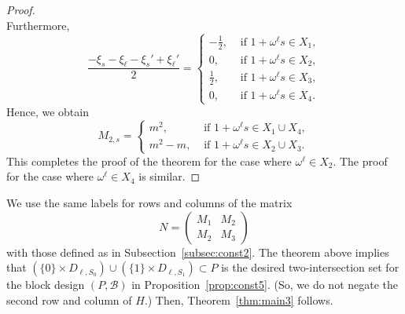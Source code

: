 \documentclass[10pt]{amsart}
\theoremstyle{definition}
\begin{document}
\begin{proof}
\[\]
Furthermore,
\[
\frac{-\xi_s-\xi_{\ell}-\xi_s'+\xi_{\ell}'}{2}=
\begin{cases}
-\frac{1}{2},& \text{ if } 1+\omega^{\ell} s\in X_1,\\
0,& \text{ if } 1+\omega^{\ell} s\in X_2, \\
\frac{1}{2},& \text{ if }1+\omega^{\ell} s\in X_3,\\
0,& \text{ if } 1+\omega^{\ell} s\in X_4.
\end{cases}
\]
Hence, we obtain
\[
M_{2,s}=
\begin{cases}
m^2,& \text{ if } 1+\omega^\ell s\in X_1 \cup X_4,\\
m^2-m,& \text{ if } 1+\omega^\ell s\in X_2 \cup X_3.
\end{cases}
\]
This completes the proof of the theorem for the case where $\omega^\ell \in X_2$. The proof for the case where $\omega^\ell \in X_4$ is similar.
\end{proof}

We use the same labels for rows and columns of the matrix
\[
N=
\begin{pmatrix} M_1 & M_2 \\
M_2 & M_3
\end{pmatrix}
\]
with those defined as in Subsection~\ref{subsec:const2}. The theorem above implies that $(\{0\}\times D_{\ell,S_0}) \cup (\{1\}\times D_{\ell,S_1})\subset P$ is the desired two-intersection set for the block design $(P,{\mathcal B})$ in Proposition~\ref{prop:const5}. (So, we do not negate the second row and column of $H$.) Then, Theorem~\ref{thm:main3} follows.
\end{document}
